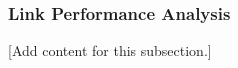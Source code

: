 
\subsubsection{Link Performance Analysis}
\label{subsubsec:design_5_5_link_performance_analysis}

[Add content for this subsection.]
